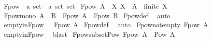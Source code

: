\begin{isabellebody}
\endisatagproof
{\isafoldproof}%
%
\isadelimproof
%
\endisadelimproof
%
\isadelimdocument
%
\endisadelimdocument
%
\isatagdocument
%
\isamarkuptrue%
%
\endisatagdocument
{\isafolddocument}%
%
\isadelimdocument
%
\endisadelimdocument
{}\isamarkupfalse%
\ Fpow\ {\isacharcolon}{\kern0pt}{\isacharcolon}{\kern0pt}\ {\isachardoublequoteopen}{\isacharprime}{\kern0pt}a\ set\ {\isasymRightarrow}\ {\isacharprime}{\kern0pt}a\ set\ set{\isachardoublequoteclose}\isanewline
{}\ {\isachardoublequoteopen}Fpow\ A\ {\isasymequiv}\ {\isacharbraceleft}{\kern0pt}X{\isachardot}{\kern0pt}\ X\ {\isasymsubseteq}\ A\ {\isasymand}\ finite\ X{\isacharbraceright}{\kern0pt}{\isachardoublequoteclose}\isanewline
\isanewline
{}\isamarkupfalse%
\ Fpow{\isacharunderscore}{\kern0pt}mono{\isacharcolon}{\kern0pt}\ {\isachardoublequoteopen}A\ {\isasymsubseteq}\ B\ {\isasymLongrightarrow}\ Fpow\ A\ {\isasymsubseteq}\ Fpow\ B{\isachardoublequoteclose}\isanewline
%
\isadelimproof
%
\endisadelimproof
%
\isatagproof
{}\isamarkupfalse%
\ Fpow{\isacharunderscore}{\kern0pt}def\ \isamarkupfalse%
\ auto%
\endisatagproof
{\isafoldproof}%
%
\isadelimproof
\isanewline
%
\endisadelimproof
\isanewline
{}\isamarkupfalse%
\ empty{\isacharunderscore}{\kern0pt}in{\isacharunderscore}{\kern0pt}Fpow{\isacharcolon}{\kern0pt}\ {\isachardoublequoteopen}{\isacharbraceleft}{\kern0pt}{\isacharbraceright}{\kern0pt}\ {\isasymin}\ Fpow\ A{\isachardoublequoteclose}\isanewline
%
\isadelimproof
%
\endisadelimproof
%
\isatagproof
{}\isamarkupfalse%
\ Fpow{\isacharunderscore}{\kern0pt}def\ \isamarkupfalse%
\ auto%
\endisatagproof
{\isafoldproof}%
%
\isadelimproof
\isanewline
%
\endisadelimproof
\isanewline
{}\isamarkupfalse%
\ Fpow{\isacharunderscore}{\kern0pt}not{\isacharunderscore}{\kern0pt}empty{\isacharcolon}{\kern0pt}\ {\isachardoublequoteopen}Fpow\ A\ {\isasymnoteq}\ {\isacharbraceleft}{\kern0pt}{\isacharbraceright}{\kern0pt}{\isachardoublequoteclose}\isanewline
%
\isadelimproof
%
\endisadelimproof
%
\isatagproof
{}\isamarkupfalse%
\ empty{\isacharunderscore}{\kern0pt}in{\isacharunderscore}{\kern0pt}Fpow\ \isamarkupfalse%
\ blast%
\endisatagproof
{\isafoldproof}%
%
\isadelimproof
\isanewline
%
\endisadelimproof
\isanewline
{}\isamarkupfalse%
\ Fpow{\isacharunderscore}{\kern0pt}subset{\isacharunderscore}{\kern0pt}Pow{\isacharcolon}{\kern0pt}\ {\isachardoublequoteopen}Fpow\ A\ {\isasymsubseteq}\ Pow\ A{\isachardoublequoteclose}\isanewline

\end{isabellebody}
